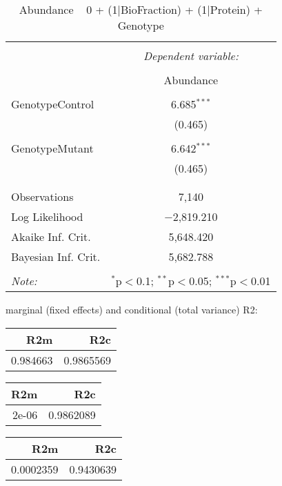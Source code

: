 \documentclass[11pt]{report}
\begin{document}
\begin{table}[!htbp] \centering 
  \caption{Abundance ~ 0 + (1|BioFraction) + (1|Protein) + Genotype} 
  \label{} 
\begin{tabular}{@{\extracolsep{5pt}}lc} 
\\[-1.8ex]\hline 
\hline \\[-1.8ex] 
 & \multicolumn{1}{c}{\textit{Dependent variable:}} \\ 
\cline{2-2} 
\\[-1.8ex] & Abundance \\ 
\hline \\[-1.8ex] 
 GenotypeControl & 6.685$^{***}$ \\ 
  & (0.465) \\ 
  & \\ 
 GenotypeMutant & 6.642$^{***}$ \\ 
  & (0.465) \\ 
  & \\ 
\hline \\[-1.8ex] 
Observations & 7,140 \\ 
Log Likelihood & $-$2,819.210 \\ 
Akaike Inf. Crit. & 5,648.420 \\ 
Bayesian Inf. Crit. & 5,682.788 \\ 
\hline 
\hline \\[-1.8ex] 
\textit{Note:}  & \multicolumn{1}{r}{$^{*}$p$<$0.1; $^{**}$p$<$0.05; $^{***}$p$<$0.01} \\ 
\end{tabular} 
\end{table} 
marginal (fixed effects) and conditional (total variance) R2:

\begin{tabular}{r|r}
\hline
R2m & R2c\\
\hline
0.984663 & 0.9865569\\
\hline
\end{tabular}

\begin{tabular}{r|r}
\hline
R2m & R2c\\
\hline
2e-06 & 0.9862089\\
\hline
\end{tabular}

\begin{tabular}{r|r}
\hline
R2m & R2c\\
\hline
0.0002359 & 0.9430639\\
\hline
\end{tabular}
\end{document}

